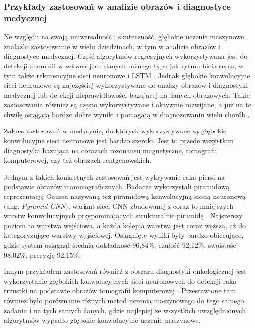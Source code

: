 \subsubsection{Przykłady zastosowań w analizie obrazów i diagnostyce medycznej}

Ne względu na swoją uniwersalność i skuteczność, głębokie uczenie maszynowe znalazło zastosowanie w wielu dziedzinach, w tym w analizie obrazów i diagnostyce medycznej.
Część algorytmów regresyjnych wykorzystywana jest do detekcji anomalii w sekwencjach danych różnego typu jak rytmu bicia serca, w tym także rekurencyjne sieci neuronowe i LSTM \cite{fernando2021deep}.
Jednak głębokie konwolucyjne sieci neuronowe są najczęściej wykorzystywane do analizy obrazów i diagnostyki medycznej lub detekcji nieprawidłowości bazującej na danych obrazowych.
Takie zastosowania również są często wykorzystywane i aktywnie rozwijane, a już na te chwilę osiągają bardzo dobre wyniki i pomagają w diagnozowaniu wielu chorób \cite{liu2017survey}.

Zakres zastosowań w medycynie, do których wykorzystywane są głębokie konwolucyjne sieci neuronowe jest bardzo szeroki.
Jest to przede wszystkim diagnostyka bazująca na obrazach rezonansu magnetyczne, tomografii komputerowej, czy też obrazach rentgenowskich.

Jednym z takich konkretnych zastosowań jest wykrywanie raka piersi na podstawie obrazów mammograficznych.
Badacze wykorzystali piramidową reprezentację Gaussa nazywaną też piramidową konwolucyjną siecią neuronową (ang. \emph{Pyramid-CNN}), wariant sieci CNN zbudowanej z coraz to mniejszych warstw konwolucyjnych przypominających strukturalnie piramidę \cite{bakkouri2019multi}.
Najszerszy poziom to warstwa wejściowa, a każda kolejna warstwa jest coraz węższa, aż do kategoryzujące warstwy wyjściowej.
Osiągnięte wyniki były bardzo obiecujące, gdzie system osiągnął średnią dokładność 96,84\%, czułość 92,12\%, swoistość 98,02\%, precyzję 92,15\%.

Innym przykładem zastosowań również z obszaru diagnostyki onkologicznej jest wykorzystanie głębokich konwolucyjnych sieci neuronowych do detekcji raka trzustki na podstawie obrazów tomografii komputerowej \cite{sekaran2020deep}.
Przestawione tam również było porównanie różnych metod uczenia maszynowego do tego samego zadania i na tych samych danych, gdzie najlepiej ze wszystkich uwzględnionych algorytmów wypadło głębokie konwolucyjne uczenie maszynowe.

